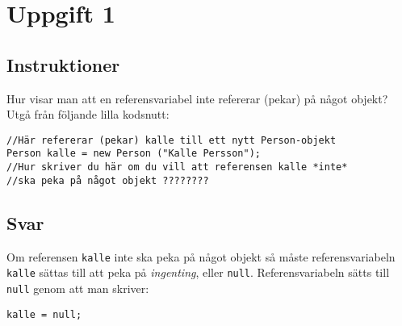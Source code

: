\section{Uppgift 1}\label{sec:uppg01}

\subsection{Instruktioner}
Hur visar man att en referensvariabel inte refererar (pekar) på något
objekt? Utgå från följande lilla kodsnutt:

\begin{Verbatim}[fontsize=\small]
//Här refererar (pekar) kalle till ett nytt Person-objekt
Person kalle = new Person ("Kalle Persson");
//Hur skriver du här om du vill att referensen kalle *inte*
//ska peka på något objekt ????????
\end{Verbatim}


\subsection{Svar}
Om referensen \texttt{kalle} inte ska peka på något objekt så måste
referensvariabeln \texttt{kalle} sättas till att peka på \emph{ingenting},
eller \texttt{null}.  Referensvariabeln sätts till \texttt{null} genom att man
skriver:
\begin{verbatim}kalle = null;\end{verbatim}

